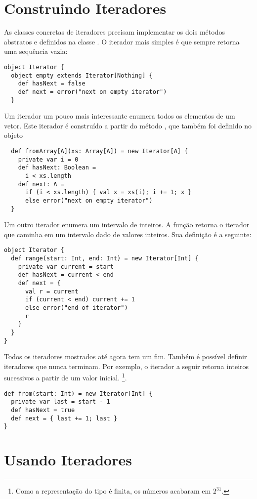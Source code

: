 \section{Construindo Iteradores}

As classes concretas de iteradores precisam implementar os dois métodos abstratos
  e  definidos na classe
. O iterador mais simples é  que sempre retorna uma
sequência vazia:
\begin{lstlisting}
object Iterator {
  object empty extends Iterator[Nothing] {
    def hasNext = false
    def next = error("next on empty iterator")
  }
\end{lstlisting}
Um iterador um pouco mais interessante enumera todos os elementos de um vetor. Este iterador
é construído a partir do método , que também foi definido no objeto 
\begin{lstlisting}
  def fromArray[A](xs: Array[A]) = new Iterator[A] {
    private var i = 0
    def hasNext: Boolean =
      i < xs.length
    def next: A =
      if (i < xs.length) { val x = xs(i); i += 1; x }
      else error("next on empty iterator")
  }
\end{lstlisting}
Um outro iterador enumera um intervalo de inteiros. A função
 retorna o iterador que caminha em um intervalo dado de valores inteiros.
Sua definição é a seguinte:
\begin{lstlisting}
object Iterator {
  def range(start: Int, end: Int) = new Iterator[Int] {
    private var current = start
    def hasNext = current < end
    def next = {
      val r = current
      if (current < end) current += 1
      else error("end of iterator")
      r
    }
  }
}
\end{lstlisting}
Todos os iteradores mostrados até agora tem um fim. Também é possível
definir iteradores que nunca terminam. Por exemplo, o iterador a seguir
retorna inteiros sucessivos a partir de um valor inicial. 
\footnote{Como a representação do tipo  é finita, os números acabaram em $2^{31}$.}.
\begin{lstlisting}
def from(start: Int) = new Iterator[Int] {
  private var last = start - 1
  def hasNext = true
  def next = { last += 1; last }
}
\end{lstlisting}

\section{Usando Iteradores}

